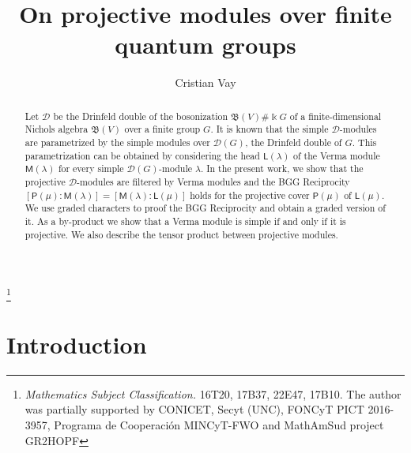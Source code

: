 \documentclass[reqno]{amsart}
\renewcommand{\_}[1]{_{\left( #1 \right)}}
\renewcommand{\^}[1]{^{\left( #1 \right)}}
\newcommand{\ku}{\Bbbk}
\newcommand\fL{\mathsf{L}}
\newcommand\fM{\mathsf{M}}
\newcommand\fP{\mathsf{P}}
\newcommand{\D}{\mathcal{D}}
\newcommand{\BV}{{\mathfrak B}}
\theoremstyle{plain}
\theoremstyle{definition}
\theoremstyle{remark}
\begin{document}
\title{On projective modules over finite quantum groups}

\author[Cristian Vay]{Cristian Vay}

% 

\address{FaMAF-CIEM (CONICET), Universidad Nacional de C\'ordoba, Medina A\-llen\-de s/n, Ciudad Universitaria, 5000 C\' ordoba, Rep\'ublica Argentina.} 

\thanks{ \emph{Mathematics Subject Classification.} 16T20, 17B37, 22E47, 17B10.
\newline The author was partially supported by CONICET, Secyt (UNC), FONCyT PICT 2016-3957, Programa de Cooperaci\'on MINCyT-FWO and MathAmSud project GR2HOPF}

\begin{abstract}
Let $\D$ be the Drinfeld double of the bosonization $\BV(V)\#\ku G$ of a finite-dimensional Nichols algebra $\BV(V)$ over a finite group $G$. It is known that the simple $\D$-modules are parametrized by the simple modules over $\D(G)$, the Drinfeld double of $G$. This parametrization can be obtained by considering the head $\fL(\lambda)$ of the Verma module $\fM(\lambda)$ for every simple $\D(G)$-module $\lambda$. In the present work, we show that the projective $\D$-modules are filtered by Verma modules and the BGG Reciprocity $[\fP(\mu):\fM(\lambda)]=[\fM(\lambda):\fL(\mu)]$ holds for the projective cover $\fP(\mu)$ of $\fL(\mu)$. We use graded characters to proof the BGG Reciprocity and obtain a graded version of it. As a by-product we show that a Verma module is simple if and only if it is projective. We also describe the tensor product between projective modules.

\end{abstract}

\maketitle


\section{Introduction}
\end{document}
